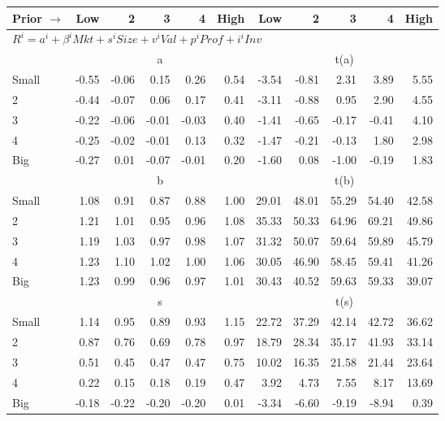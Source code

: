 
\begin{tabular}{lrrrrrrrrrr}
  \toprule
    
    Prior $\rightarrow$ & Low & 2 & 3 & 4 & High & Low & 2 & 3 & 4 & High  \\ 
  \midrule
  \multicolumn{11}{l}{$R^i=a^i+\beta^iMkt+s^iSize+v^iVal+p^iProf+i^iInv$}  \\
  
     & \multicolumn{5}{c}{a} & \multicolumn{5}{c}{t(a)}   \\
     \cmidrule(r){2-6} \cmidrule(r){7-11} 
    Small  & -0.55  & -0.06  & 0.15  & 0.26  & 0.54  & -3.54  & -0.81  & 2.31  & 3.89  & 5.55   \\
    2  & -0.44  & -0.07  & 0.06  & 0.17  & 0.41  & -3.11  & -0.88  & 0.95  & 2.90  & 4.55   \\
    3  & -0.22  & -0.06  & -0.01  & -0.03  & 0.40  & -1.41  & -0.65  & -0.17  & -0.41  & 4.10   \\
    4  & -0.25  & -0.02  & -0.01  & 0.13  & 0.32  & -1.47  & -0.21  & -0.13  & 1.80  & 2.98   \\
    Big  & -0.27  & 0.01  & -0.07  & -0.01  & 0.20  & -1.60  & 0.08  & -1.00  & -0.19  & 1.83   \\
    
  
     & \multicolumn{5}{c}{b} & \multicolumn{5}{c}{t(b)}   \\
     \cmidrule(r){2-6} \cmidrule(r){7-11} 
    Small  & 1.08  & 0.91  & 0.87  & 0.88  & 1.00  & 29.01  & 48.01  & 55.29  & 54.40  & 42.58   \\
    2  & 1.21  & 1.01  & 0.95  & 0.96  & 1.08  & 35.33  & 50.33  & 64.96  & 69.21  & 49.86   \\
    3  & 1.19  & 1.03  & 0.97  & 0.98  & 1.07  & 31.32  & 50.07  & 59.64  & 59.89  & 45.79   \\
    4  & 1.23  & 1.10  & 1.02  & 1.00  & 1.06  & 30.05  & 46.90  & 58.45  & 59.41  & 41.26   \\
    Big  & 1.23  & 0.99  & 0.96  & 0.97  & 1.01  & 30.43  & 40.52  & 59.63  & 59.33  & 39.07   \\
    
  
     & \multicolumn{5}{c}{s} & \multicolumn{5}{c}{t(s)}   \\
     \cmidrule(r){2-6} \cmidrule(r){7-11} 
    Small  & 1.14  & 0.95  & 0.89  & 0.93  & 1.15  & 22.72  & 37.29  & 42.14  & 42.72  & 36.62   \\
    2  & 0.87  & 0.76  & 0.69  & 0.78  & 0.97  & 18.79  & 28.34  & 35.17  & 41.93  & 33.14   \\
    3  & 0.51  & 0.45  & 0.47  & 0.47  & 0.75  & 10.02  & 16.35  & 21.58  & 21.44  & 23.64   \\
    4  & 0.22  & 0.15  & 0.18  & 0.19  & 0.47  & 3.92  & 4.73  & 7.55  & 8.17  & 13.69   \\
    Big  & -0.18  & -0.22  & -0.20  & -0.20  & 0.01  & -3.34  & -6.60  & -9.19  & -8.94  & 0.39   \\
    

\end{tabular}
